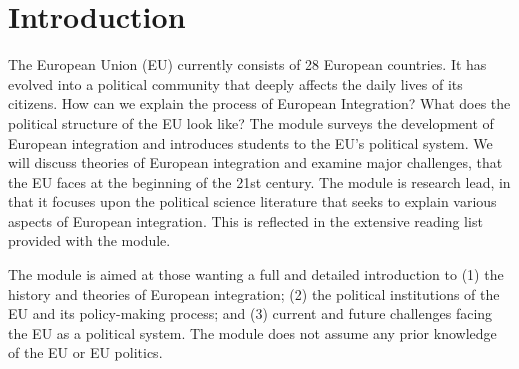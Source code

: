 
\section*{Introduction}

	The European Union (EU) currently consists of 28 European countries. It has evolved into a political community that deeply affects the daily lives of its citizens. How can we explain the process of European Integration? What does the political structure of the EU look like? The module surveys the development of European integration and introduces students to the EU’s political system. We will discuss theories of European integration and examine major challenges, that the EU faces at the beginning of the 21st century. The module is research lead, in that it focuses upon the political science literature that seeks to explain various aspects of European integration. This is reflected in the extensive reading list provided with the module.

	The module is aimed at those wanting a full and detailed introduction to (1) the history and theories of European integration; (2) the political institutions of the EU and its policy-making process; and (3) current and future challenges facing the EU as a political system. The module does not assume any prior knowledge of the EU or EU politics.